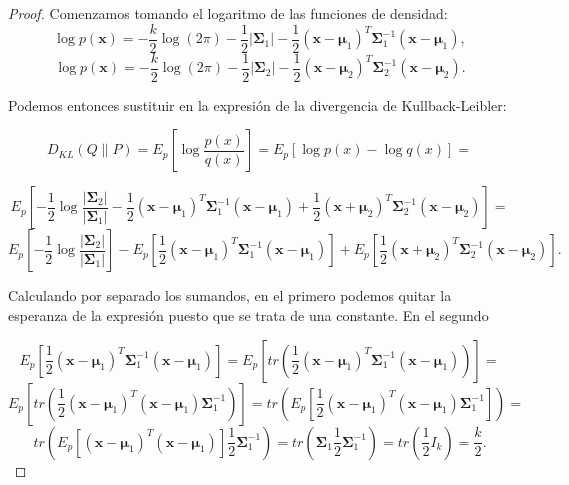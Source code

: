 \begin{proof}
Comenzamos tomando el logaritmo de las funciones de densidad: $$ \log p(\textbf{x}) = -\frac{k}{2}\log(2 \pi) - \frac{1}{2} \vert \boldsymbol{\Sigma}_1\vert - \frac{1}{2}(\textbf{x} - \boldsymbol{\mu}_1)^T\boldsymbol{\Sigma}_1^{-1}(\textbf{x} - \boldsymbol{\mu}_1),$$ $$ \log p(\textbf{x}) = -\frac{k}{2}\log(2 \pi) - \frac{1}{2} \vert \boldsymbol{\Sigma}_2\vert - \frac{1}{2}(\textbf{x} - \boldsymbol{\mu}_2)^T\boldsymbol{\Sigma}_2^{-1}(\textbf{x} - \boldsymbol{\mu}_2).$$

Podemos entonces sustituir en la expresión de la divergencia de Kullback-Leibler:

$$D_{KL}(Q \parallel P) = E_p \left[ \log \frac{p(x)}{q(x)} \right] = E_p \left[ \log p(x) - \log q(x) \right] =$$

$$ E_p \left[- \frac{1}{2} \log \frac{\vert \boldsymbol{\Sigma}_2\vert}{\vert \boldsymbol{\Sigma}_1\vert} - \frac{1}{2}(\textbf{x} - \boldsymbol{\mu}_1)^T\boldsymbol{\Sigma}_1^{-1}(\textbf{x} - \boldsymbol{\mu}_1) + \frac{1}{2}(\textbf{x} + \boldsymbol{\mu}_2)^T\boldsymbol{\Sigma}_2^{-1}(\textbf{x} - \boldsymbol{\mu}_2) \right] = $$ $$E_p \left[- \frac{1}{2} \log \frac{\vert \boldsymbol{\Sigma}_2\vert}{\vert \boldsymbol{\Sigma}_1\vert}\right] - E_p\left[ \frac{1}{2}(\textbf{x} - \boldsymbol{\mu}_1)^T\boldsymbol{\Sigma}_1^{-1}(\textbf{x} - \boldsymbol{\mu}_1)\right]  + E_p\left[\frac{1}{2}(\textbf{x} + \boldsymbol{\mu}_2)^T\boldsymbol{\Sigma}_2^{-1}(\textbf{x} - \boldsymbol{\mu}_2) \right] .$$

Calculando por separado los sumandos, en el primero podemos quitar la esperanza de la expresión puesto que se trata de una constante. En el segundo

$$ E_p\left[ \frac{1}{2}(\textbf{x} - \boldsymbol{\mu}_1)^T\boldsymbol{\Sigma}_1^{-1}(\textbf{x} - \boldsymbol{\mu}_1)\right] = E_p\left[ tr \left( \frac{1}{2}(\textbf{x} - \boldsymbol{\mu}_1)^T\boldsymbol{\Sigma}_1^{-1}(\textbf{x} - \boldsymbol{\mu}_1) \right) \right] = $$
$$ E_p\left[ tr \left( \frac{1}{2}(\textbf{x} - \boldsymbol{\mu}_1)^T(\textbf{x} - \boldsymbol{\mu}_1)\boldsymbol{\Sigma}_1^{-1} \right) \right] = tr \left( E_p\left[  \frac{1}{2}(\textbf{x} - \boldsymbol{\mu}_1)^T(\textbf{x} - \boldsymbol{\mu}_1)\boldsymbol{\Sigma}_1^{-1} \right] \right) =$$
$$ tr \left( E_p\left[ (\textbf{x} - \boldsymbol{\mu}_1)^T(\textbf{x} - \boldsymbol{\mu}_1) \right]\frac{1}{2} \boldsymbol{\Sigma}_1^{-1} \right) = tr \left( \boldsymbol{\Sigma}_1 \frac{1}{2} \boldsymbol{\Sigma}_1^{-1} \right) = tr\left(\frac{1}{2} I_k \right) = \frac{k}{2}.$$


\end{proof}
